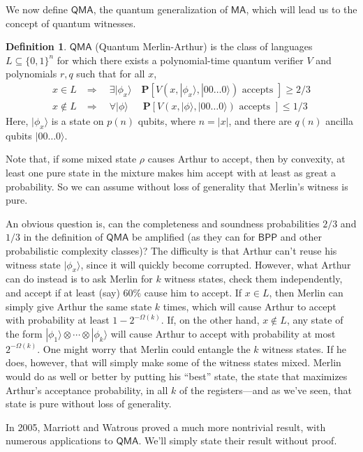 \documentclass[11pt]{report}
\theoremstyle{plain}
\theoremstyle{definition}
\newtheorem{definition}[theorem]{Definition}
\renewcommand{\Pr}{\mathbf{P}}
\renewcommand{\ket}[1]{|#1\rangle}
\begin{document}
We now define $\mathsf{QMA}$, the quantum generalization of $\mathsf{MA}$, which will lead us to the concept of quantum witnesses.

\begin{definition}
$\mathsf{QMA}$ (Quantum Merlin-Arthur) is the class of languages $L \subseteq \{0,1\}^n$ for which there exists a polynomial-time quantum verifier $V$ and polynomials $r,q$ such that for all $x$,
\begin{align*}
x \in L & \Rightarrow \quad \exists \ket{\phi_x} \quad  \Pr[V(x,\ket{\phi_x},\ket{00\dots 0}) \text{ accepts }]    \geq 2/3 \\
x \notin L & \Rightarrow \quad \forall \ket{\phi}  \quad \; \ \Pr[V(x,\ket{\phi},\ket{00\dots 0}) \text{ accepts }]    \leq  1/3
\end{align*}
Here, $\ket{\phi_x}$ is a state on $p(n)$ qubits, where $n=|x|$, and there are $q(n)$ ancilla qubits $\ket{00\dots 0}$.
\end{definition}

Note that, if some mixed state $\rho$ causes Arthur to accept, then by convexity, at least one pure state in the mixture makes him accept with at least as great a probability.  So we can assume without loss of generality that Merlin's witness is pure.

An obvious question is, can the completeness and soundness probabilities $2/3$ and $1/3$ in the definition of $\mathsf{QMA}$ be amplified (as they can for
$\mathsf{BPP}$ and other probabilistic complexity classes)?  The difficulty is that Arthur can't reuse his witness state $\ket{\phi_x}$, since it will quickly become corrupted.  However, what Arthur can do instead is to ask Merlin for $k$ witness states, check them independently, and accept if at least (say) $60\%$ cause him to accept.  If $x \in L$, then Merlin can simply give Arthur the same state $k$ times, which will cause Arthur to accept with probability at least $1-2^{-\Omega(k)}$.  If, on the other hand, $x \notin L$, any state of the form $\ket{\phi_1}\otimes \cdots \otimes \ket{\phi_k}$ will cause Arthur to accept with probability at most $2^{-\Omega(k)}$. One might worry that Merlin could entangle the $k$ witness states. If he does, however, that will simply make some of the witness states mixed. Merlin would do as well or better by putting his ``best'' state, the state that maximizes Arthur's acceptance probability, in all $k$ of the registers---and as we've seen, that state is pure without loss of generality.

In 2005, Marriott and Watrous \cite{DBLP:journals/cc/MarriottW05} proved a much more nontrivial result, with numerous applications to $\mathsf{QMA}$. We'll simply state their result without proof.
\end{document}
